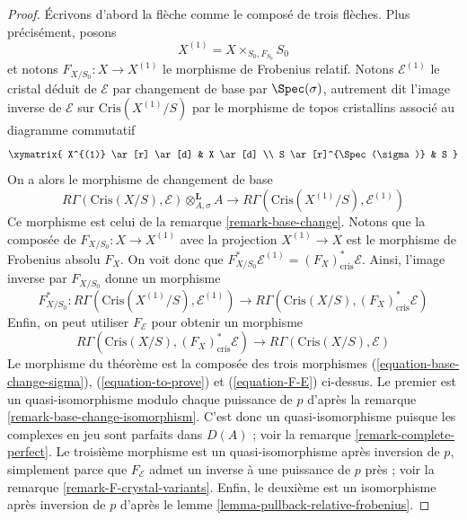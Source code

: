 \begin{proof}
Écrivons d'abord la flèche comme le composé de trois flèches.
Plus précisément, posons
$$
X^{(1)} = X \times_{S_0, F_{S_0}} S_0
$$
et notons $F_{X/S_0} : X \to X^{(1)}$ le morphisme de Frobenius relatif.
Notons $\mathcal{E}^{(1)}$ le cristal déduit de $\mathcal{E}$ par changement de base
par $\Spec(\sigma)$, autrement dit l'image inverse de $\mathcal{E}$
sur $\text{Cris}(X^{(1)}/S)$ par le morphisme de topos cristallins
associé au diagramme commutatif
$$
\xymatrix{
X^{(1)} \ar[r] \ar[d] & X \ar[d] \\
S \ar[r]^{\Spec(\sigma)} & S
}
$$
On a alors le morphisme de changement de base
\begin{equation}
\label{equation-base-change-sigma}
R\Gamma(\text{Cris}(X/S), \mathcal{E}) \otimes^\mathbf{L}_{A, \sigma} A
\longrightarrow
R\Gamma(\text{Cris}(X^{(1)}/S), \mathcal{E}^{(1)})
\end{equation}
Ce morphisme est celui de la remarque \ref{remark-base-change}. Notons que la composée
de $F_{X/S_0} : X \to X^{(1)}$ avec la projection $X^{(1)} \to X$
est le morphisme de Frobenius absolu $F_X$. On voit donc que
$F_{X/S_0}^*\mathcal{E}^{(1)} = (F_X)_{\text{cris}}^*\mathcal{E}$.
Ainsi, l'image inverse par $F_{X/S_0}$ donne un morphisme
\begin{equation}
\label{equation-to-prove}
F_{X/S_0}^* :
R\Gamma(\text{Cris}(X^{(1)}/S), \mathcal{E}^{(1)})
\longrightarrow
R\Gamma(\text{Cris}(X/S), (F_X)^*_{\text{cris}}\mathcal{E})
\end{equation}
Enfin, on peut utiliser $F_\mathcal{E}$ pour obtenir un morphisme
\begin{equation}
\label{equation-F-E}
R\Gamma(\text{Cris}(X/S), (F_X)^*_{\text{cris}}\mathcal{E})
\longrightarrow
R\Gamma(\text{Cris}(X/S), \mathcal{E})
\end{equation}
Le morphisme du théorème est la composée des trois morphismes
(\ref{equation-base-change-sigma}), (\ref{equation-to-prove}) et
(\ref{equation-F-E}) ci-dessus. Le premier est un
quasi-isomorphisme modulo chaque puissance de $p$ d'après la
remarque \ref{remark-base-change-isomorphism}.
C'est donc un quasi-isomorphisme puisque les complexes en jeu sont parfaits
dans $D(A)$ ; voir la remarque \ref{remark-complete-perfect}.
Le troisième morphisme est un quasi-isomorphisme après inversion de $p$, simplement
parce que $F_\mathcal{E}$ admet un inverse à une puissance de $p$ près ; voir la
remarque \ref{remark-F-crystal-variants}.
Enfin, le deuxième est un isomorphisme après inversion de $p$
d'après le lemme \ref{lemma-pullback-relative-frobenius}.
\end{proof}












